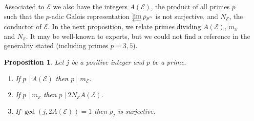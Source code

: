 \documentclass{amsart}
\theoremstyle{plain}
\newtheorem{prop}[theorem]{Proposition}
\theoremstyle{remark}
\newcommand{\E}{\mathcal{E}}
\begin{document}
Associated to $\E$ we also have the integers $A(\E)$, the product of all primes $p$ such that the $p$-adic Galois representation $\varprojlim \rho_{p^n}$ is not surjective, and $N_\E$, the conductor of $\E$. In the next proposition, we relate primes dividing $A(\E)$, $m_\E$ and $N_\E$. It may be well-known to experts, but we could not find a reference in the generality stated (including primes $p = 3, 5$).

\begin{prop}\label{prop:Avsm} Let $j$ be a positive integer and $p$ be a prime.
\begin{enumerate}
    \item If $p \mid A(\E)$ then $p \mid m_\E$.
    \item If $p \mid m_\E$ then $p \mid 2 N_\E A(\E)$.
    \item If $\gcd(j, 2A(\E)) = 1$ then $\rho_j$ is surjective.
\end{enumerate}
\end{prop}
\end{document}
